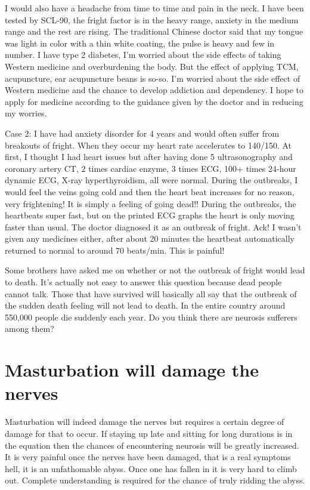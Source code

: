 \documentclass[
]{book}
\begin{document}
I would also have a headache from time to time and pain in the neck. I have been tested by SCL-90, the fright factor is in the heavy range, anxiety in the medium range and the rest are rising. The traditional Chinese doctor said that my tongue was light in color with a thin white coating, the pulse is heavy and few in number. I have type 2 diabetes, I'm worried about the side effects of taking Western medicine and overburdening the body. But the effect of applying TCM, acupuncture, ear acupuncture beans is so-so. I'm worried about the side effect of Western medicine and the chance to develop addiction and dependency. I hope to apply for medicine according to the guidance given by the doctor and in reducing my worries.

Case 2: I have had anxiety disorder for 4 years and would often suffer from breakouts of fright. When they occur my heart rate accelerates to 140/150. At first, I thought I had heart issues but after having done 5 ultrasonography and coronary artery CT, 2 times cardiac enzyme, 3 times ECG, 100+ times 24-hour dynamic ECG, X-ray hyperthyroidism, all were normal. During the outbreaks, I would feel the veins going cold and then the heart beat increases for no reason, very frightening! It is simply a feeling of going dead!! During the outbreaks, the heartbeats super fast, but on the printed ECG graphs the heart is only moving faster than usual. The doctor diagnosed it as an outbreak of fright. Ack! I wasn't given any medicines either, after about 20 minutes the heartbeat automatically returned to normal to around 70 beats/min. This is painful!

Some brothers have asked me on whether or not the outbreak of fright would lead to death. It's actually not easy to answer this question because dead people cannot talk. Those that have survived will basically all say that the outbreak of the sudden death feeling will not lead to death. In the entire country around 550,000 people die suddenly each year. Do you think there are neurosis sufferers among them?

\hypertarget{masturbation-will-damage-the-nerves}{%
\section{Masturbation will damage the nerves}\label{masturbation-will-damage-the-nerves}}

Masturbation will indeed damage the nerves but requires a certain degree of damage for that to occur. If staying up late and sitting for long durations is in the equation then the chances of encountering neurosis will be greatly increased. It is very painful once the nerves have been damaged, that is a real symptoms hell, it is an unfathomable abyss. Once one has fallen in it is very hard to climb out. Complete understanding is required for the chance of truly ridding the abyss.
\end{document}
